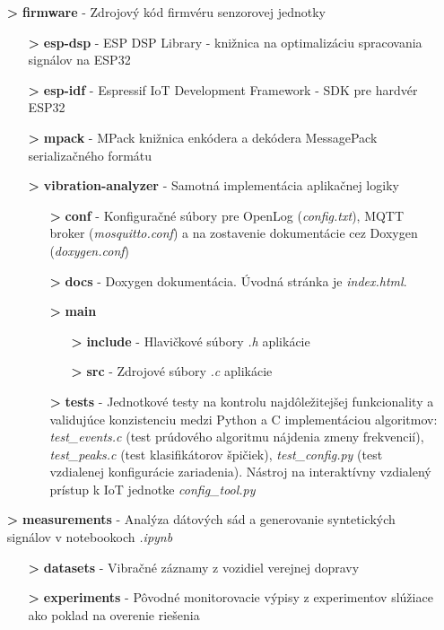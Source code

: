 \begin{itemize}[noitemsep]
\item[\textbf{>}] \textbf{firmware} - Zdrojový kód firmvéru senzorovej jednotky
	\begin{itemize}
	\item[\textbf{>}] \textbf{esp-dsp} - ESP DSP Library - knižnica na optimalizáciu spracovania signálov na ESP32
	\item[\textbf{>}] \textbf{esp-idf} - Espressif IoT Development Framework - SDK pre hardvér ESP32
	\item[\textbf{>}] \textbf{mpack} - MPack knižnica enkódera a dekódera MessagePack serializačného formátu 
	\item[\textbf{>}] \textbf{vibration-analyzer} - Samotná implementácia aplikačnej logiky
		\begin{itemize}
		\item[\textbf{>}] \textbf{conf} - Konfiguračné súbory pre OpenLog (\emph{config.txt}), MQTT broker  (\emph{mosquitto.conf})
		a na zostavenie dokumentácie cez Doxygen (\emph{doxygen.conf})
		\item[\textbf{>}] \textbf{docs} - Doxygen dokumentácia. Úvodná stránka je \emph{index.html}.
		\item[\textbf{>}] \textbf{main}
			\begin{itemize}
			\item[\textbf{>}] \textbf{include} - Hlavičkové súbory \emph{.h} aplikácie
			\item[\textbf{>}] \textbf{src} - Zdrojové súbory \emph{.c} aplikácie
			\end{itemize}
		\item[\textbf{>}] \textbf{tests} - Jednotkové testy na kontrolu najdôležitejšej funkcionality a validujúce konzistenciu
		medzi Python a C implementáciou algoritmov: \emph{test\_events.c} (test prúdového algoritmu nájdenia zmeny frekvencií),
		\emph{test\_peaks.c} (test klasifikátorov špičiek), \emph{test\_config.py} (test vzdialenej konfigurácie zariadenia).
		Nástroj na interaktívny vzdialený prístup k IoT jednotke \emph{config\_tool.py}
		\end{itemize}
	\end{itemize}
\item[\textbf{>}] \textbf{measurements} - Analýza dátových sád a generovanie syntetických signálov v notebookoch \emph{.ipynb}
	\begin{itemize}
	\item[\textbf{>}] \textbf{datasets} - Vibračné záznamy z vozidiel verejnej dopravy
	\item[\textbf{>}] \textbf{experiments} - Pôvodné monitorovacie výpisy z experimentov slúžiace ako poklad na overenie riešenia

\end{itemize}
\end{itemize}
